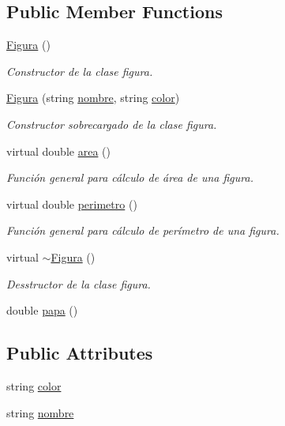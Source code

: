 \subsection*{Public Member Functions}
\begin{DoxyCompactItemize}
\item 
\hyperlink{class_figura_a6977c7f0438c11b985a9a74c208b51c8}{Figura} ()
\begin{DoxyCompactList}\small\item\em Constructor de la clase figura. \end{DoxyCompactList}\item 
\hyperlink{class_figura_a35962837dabe47162c4f7549175f6f81}{Figura} (string \hyperlink{class_figura_a5be336617ed8a4d4f28115297b38da02}{nombre}, string \hyperlink{class_figura_a9f519b9504b95440f124a3099070e952}{color})
\begin{DoxyCompactList}\small\item\em Constructor sobrecargado de la clase figura. \end{DoxyCompactList}\item 
virtual double \hyperlink{class_figura_ade6b12995c86cb72e37738668d77963d}{area} ()
\begin{DoxyCompactList}\small\item\em Función general para cálculo de área de una figura. \end{DoxyCompactList}\item 
virtual double \hyperlink{class_figura_a7451dfc1da3533fa15205df11afe7ac3}{perimetro} ()
\begin{DoxyCompactList}\small\item\em Función general para cálculo de perímetro de una figura. \end{DoxyCompactList}\item 
virtual \hyperlink{class_figura_a6130eb548893c36efcb7933e2da6821e}{$\sim$\+Figura} ()
\begin{DoxyCompactList}\small\item\em Desstructor de la clase figura. \end{DoxyCompactList}\item 
double \hyperlink{class_figura_ab1fcaf672655f51ec58a55be75cb3f12}{papa} ()
\end{DoxyCompactItemize}
\subsection*{Public Attributes}
\begin{DoxyCompactItemize}
\item 
string \hyperlink{class_figura_a9f519b9504b95440f124a3099070e952}{color}
\item 
string \hyperlink{class_figura_a5be336617ed8a4d4f28115297b38da02}{nombre}
\end{DoxyCompactItemize}


